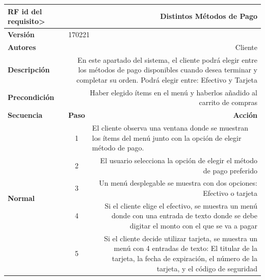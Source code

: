 \documentclass[conference]{IEEEtran}
\begin{document}
\begin{table}[H]
  \centering
   \begin{adjustbox}{width=0.45\textwidth}
    \begin{tabular}{|p{11.215em}|r|r|}
    \toprule
    \textbf{RF id del requisito>} & \multicolumn{2}{p{37.355em}|}{\textbf{Distintos Métodos de Pago}} \\
    \midrule
    \textbf{Versión} & \multicolumn{2}{l|}{170221} \\
    \midrule
    \textbf{Autores} & \multicolumn{2}{p{37.355em}|}{Cliente} \\
    \midrule
    \textbf{Descripción} & \multicolumn{2}{p{37.355em}|}{En este apartado del sistema, el cliente podrá elegir entre los métodos de pago disponibles cuando desea terminar y completar su orden. Podrá elegir entre: Efectivo y Tarjeta} \\
    \midrule
    \textbf{Precondición} & \multicolumn{2}{p{37.355em}|}{Haber elegido ítems en el menú y haberlos añadido al carrito de compras} \\
    \midrule
    \textbf{Secuencia} & \multicolumn{1}{p{5.355em}|}{\textbf{Paso}} & \multicolumn{1}{p{32em}|}{\textbf{Acción}} \\
    \midrule
    \multirow{8}[14]{*}{\textbf{Normal}} & \multicolumn{1}{c|}{\multirow{2}[2]{*}{1}} & \multicolumn{1}{l|}{\multirow{2}[2]{*}{El cliente observa una ventana donde se muestran los ítems del menú junto con la opción de elegir método de pago.}} \\
    \multicolumn{1}{|c|}{} &       &  \\
\cmidrule{2-3}    \multicolumn{1}{|c|}{} & \multicolumn{1}{c|}{2} & \multicolumn{1}{p{32em}|}{El usuario selecciona la opción de elegir el método de pago preferido} \\
\cmidrule{2-3}    \multicolumn{1}{|c|}{} & \multicolumn{1}{c|}{3} & \multicolumn{1}{p{32em}|}{Un menú desplegable se muestra con dos opciones: Efectivo o tarjeta} \\
\cmidrule{2-3}    \multicolumn{1}{|c|}{} & \multicolumn{1}{c|}{4} & \multicolumn{1}{p{32em}|}{Si el cliente elige el efectivo, se muestra un menú donde con una entrada de texto donde se debe digitar el monto con el que se va a pagar} \\
\cmidrule{2-3}    \multicolumn{1}{|c|}{} & \multicolumn{1}{c|}{5} & \multicolumn{1}{p{32em}|}{Si el cliente decide utilizar tarjeta, se muestra un menú con 4 entradas de texto: El titular de la tarjeta, la fecha de expiración, el número de la tarjeta, y el código de seguridad} \\

\end{tabular}
\end{adjustbox}
\end{table}
\end{document}
